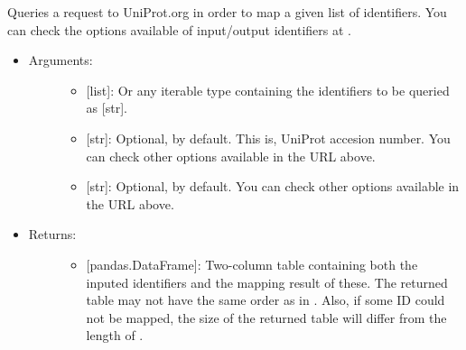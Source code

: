 \documentclass[letterpaper,10pt,english]{sphinxmanual}
\begin{document}
\begin{fulllineitems}
\label{\detokenize{databases:data_tools.databases.up_map}}
Queries a request to UniProt.org in order to map a given list of
identifiers. You can check the options available of input/output
identifiers at .
\begin{itemize}
\item {} \begin{description}
\item[{Arguments:}] \leavevmode\begin{itemize}
\item {} 
 {[}list{]}: Or any iterable type containing the
identifiers to be queried as {[}str{]}.

\item {} 
 {[}str{]}: Optional,  by default. This is,
UniProt accesion number. You can check other options available
in the URL above.

\item {} 
 {[}str{]}: Optional,  by default. You can
check other options available in the URL above.

\end{itemize}

\end{description}

\item {} \begin{description}
\item[{Returns:}] \leavevmode\begin{itemize}
\item {} 
{[}pandas.DataFrame{]}: Two-column table containing both the
inputed identifiers and the mapping result of these. 
The returned table may not have the same order as in
. Also, if some ID could not be mapped, the size of
the returned table will differ from the length of .

\end{itemize}

\end{description}


\end{itemize}
\end{fulllineitems}
\end{document}
